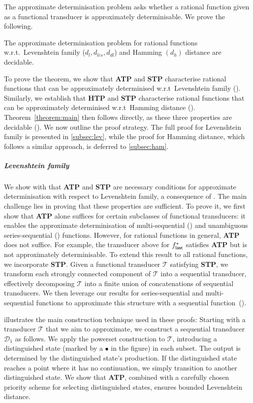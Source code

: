\documentclass[a4paper,UKenglish,cleveref, autoref, thm-restate,authorcolumns, colorlinks]{lipics-v2021}
\newcommand\calD{\mathcal{D}}
\newcommand{\trans}{\mathcal{T}}
\newcommand{\ATP}[0]{\textbf{ATP}}
\newcommand{\STP}[0]{\textbf{STP}}
\newcommand{\HTP}[0]{\textbf{HTP}}
\begin{document}
The approximate determinisation problem asks whether a rational function given as a functional transducer
is approximately determinisable.
We prove the following.
\begin{theorem}\label{theorem:main}
    The approximate determinisation problem for rational functions w.r.t.~Levenshtein family ($d_l,d_{lcs},d_{dl}$) and Hamming $(d_h)$ distance are decidable.
\end{theorem}
To prove the theorem, we show that \ATP{} and \STP{} characterise
rational functions that can be approximately determinised w.r.t~Levenshtein family ().
Similarly, we establish that \HTP{} and \STP{} characterise rational functions that can be approximately determinised
w.r.t~Hamming distance ().
Theorem~\ref{theorem:main} then follows directly,
as these three properties are decidable ().
We now outline the proof strategy.
The full proof for Levenshtein family is presented in \cref{subsec:lev},
while the proof for Hamming distance, which follows a similar approach, is deferred to \cref{subsec:ham}.

\vspace{-0.3cm}
\subparagraph*{Levenshtein family}
We show with  that \ATP{} and \STP{}
are necessary conditions for approximate determinisation with respect to Levenshtein family,
a consequence of .
The main challenge lies in proving that these properties are sufficient.
To prove it, we first show that \ATP{} alone
suffices for certain subclasses of functional transducers:
it enables the approximate determinisation of multi-sequential ()
and unambiguous series-sequential () functions.
However, for rational functions in general, \ATP{} does not suffice. For example, the transducer above for $f^*_{\sf last}$ satisfies \ATP{} but is not approximately determinisable.
To extend this result to all rational functions,
we incorporate \STP{}.
Given a functional transducer $\trans$ satisfying \STP{},
we transform each strongly connected component of  $\trans$ into a sequential transducer,
effectively decomposing $\trans$ into a finite union of concatenations of sequential transducers.
We then leverage our results for series-sequential and multi-sequential functions
to approximate this structure with a sequential function~().

 illustrates the main construction technique used in these proofs:
Starting with a transducer 
$\trans$ that we aim to approximate, we construct a sequential transducer 
$\calD_1$ as follows. We apply the powerset construction to 
$\trans$, introducing a distinguished state (marked by a $\bullet$ in the figure) in each subset.
The output is determined by the distinguished state’s production.
If the distinguished state reaches a point where it has no continuation,
we simply transition to another distinguished state.
We show that \ATP{}, combined with a carefully chosen priority scheme for selecting distinguished states,
ensures bounded Levenshtein distance.
\end{document}
